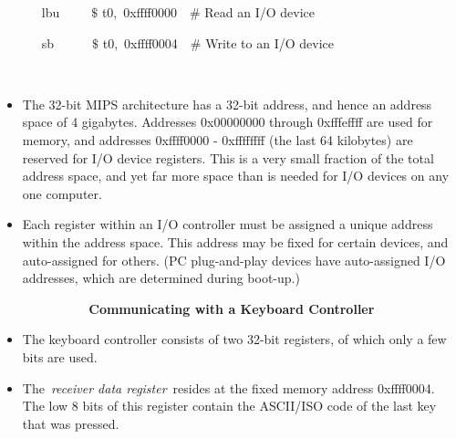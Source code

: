 \documentclass[12pt]{article}
\begin{document}
\begin{itemize}
{\fontsize{10pt}{12.0pt}\selectfont  \tabto{0.64in} \ \ \  lbu\ \ \ \ \ $\$$ t0,\ 0xffff0000\ \    $\#$  Read an I/O device\par}\par

{\fontsize{10pt}{12.0pt}\selectfont  \tabto{0.64in} \ \ \  sb\ \ \ \ \ \ $\$$ t0,\ 0xffff0004\ \    $\#$  Write to an I/O device\par}\par

{\fontsize{10pt}{12.0pt}\selectfont  \tabto{0.64in} \ \ \  \par}\par

\setlength{\parskip}{5.04pt}
	\item {\fontsize{13pt}{15.6pt}\selectfont The 32-bit MIPS architecture has a 32-bit address, and hence an address space of 4 gigabytes. Addresses 0x00000000 through 0xfffeffff are used for memory, and addresses 0xffff0000 - 0xffffffff (the last 64 kilobytes) are reserved for I/O device registers. This is a very small fraction of the total address space, and yet far more space than is needed for I/O devices on any one computer.\par}\par

	\item {\fontsize{13pt}{15.6pt}\selectfont Each register within an I/O controller must be assigned a unique address within the address space. This address may be fixed for certain devices, and auto-assigned for others. (PC plug-and-play devices have auto-assigned I/O addresses, which are determined during boot-up.)\par}\par


\vspace{\baselineskip}
{\fontsize{13pt}{15.6pt}\selectfont \textbf{\ \ \ \ \ \ \ \   Communicating with a Keyboard Controller}\par}\par

	\item {\fontsize{13pt}{15.6pt}\selectfont The keyboard controller consists of two 32-bit registers, of which only a few bits are used.\par}\par

	\item {\fontsize{13pt}{15.6pt}\selectfont The \textit{receiver data register} resides at the fixed memory address 0xffff0004. The low 8 bits of this register contain the ASCII/ISO code of the last key that was pressed.\par}\par


\end{itemize}
\end{document}
